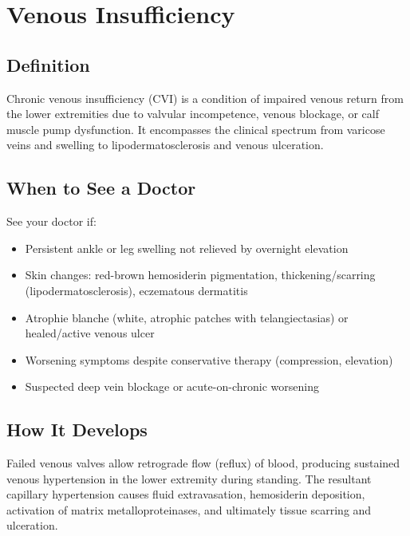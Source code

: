 \chapter{Venous Insufficiency}

\section*{Definition}
Chronic venous insufficiency (CVI) is a condition of impaired venous return from the lower extremities due to valvular incompetence, venous blockage, or calf muscle pump dysfunction. It encompasses the clinical spectrum from varicose veins and swelling to lipodermatosclerosis and venous ulceration.

\section*{When to See a Doctor}
See your doctor if:
\begin{itemize}
  \item Persistent ankle or leg swelling not relieved by overnight elevation
  \item Skin changes: red-brown hemosiderin pigmentation, thickening/scarring (lipodermatosclerosis), eczematous dermatitis
  \item Atrophie blanche (white, atrophic patches with telangiectasias) or healed/active venous ulcer
  \item Worsening symptoms despite conservative therapy (compression, elevation)
  \item Suspected deep vein blockage or acute-on-chronic worsening
\end{itemize}

\section*{How It Develops}
Failed venous valves allow retrograde flow (reflux) of blood, producing sustained venous hypertension in the lower extremity during standing. The resultant capillary hypertension causes fluid extravasation, hemosiderin deposition, activation of matrix metalloproteinases, and ultimately tissue scarring and ulceration.

